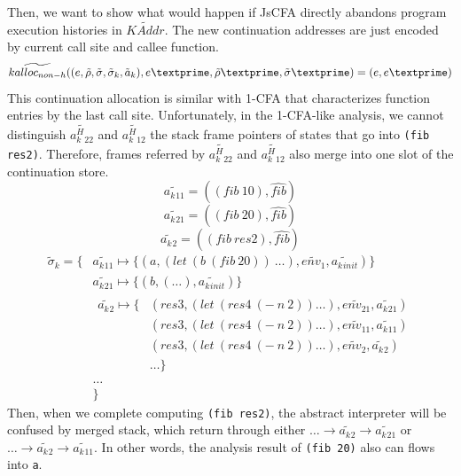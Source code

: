 \documentclass{article}
\begin{document}
Then, we want to show what would happen if JsCFA directly abandons program execution histories in $\widetilde{KAddr}$. The new continuation addresses are just encoded by current call site and callee function.
\[
\widetilde{kalloc_{non-h}} ((e, \tilde{\rho}, \tilde{\sigma}, \tilde{\sigma}_k, \tilde{a}_k), e\textprime, \tilde{\rho}\textprime, \tilde{\sigma}\textprime) =
(e, e\textprime)
\]
This continuation allocation is similar with 1-CFA that characterizes function entries by the last call site.
Unfortunately, in the 1-CFA-like analysis, we cannot distinguish $\widetilde{a^H_k{}_{22}}$ and $\widetilde{a^H_k{}_{12}}$ the stack frame pointers of states that go into \verb|(fib res2)|.
Therefore, frames referred by $\widetilde{a^H_k{}_{22}}$ and $\widetilde{a^H_k{}_{12}}$ also merge into one slot of the continuation store.
\[
\widetilde{a_k{}_{11}} = ((fib\ 10), \widehat{fib})
\]
\[
\widetilde{a_k{}_{21}} = ((fib\ 20), \widehat{fib})
\]
\[
\widetilde{a_k{}_{2}} = ((fib\ res2), \widehat{fib})
\]
\[
\begin{aligned}
\tilde{\sigma}_k = \{ {}& \widetilde{a_k{}_{11}} \mapsto \{(a, (let\ (b\ (fib\ 20))\ \dots), \widetilde{env_1}, \widetilde{a_k{}_{init}})\}  {} \\
                            & \widetilde{a_k{}_{21}} \mapsto \{(b, (\dots), \widetilde{a_k{}_{init}}) \} {}\\
                            &
                            \begin{aligned}
                              \widetilde{a_k{}_{2}} \mapsto
                              \{{}& (res3, (let\ (res4\ (-\ n\ 2)) \dots), \widetilde{env_{21}}, \widetilde{a_k{}_{21}}) {}\\
                              & (res3, (let\ (res4\ (-\ n\ 2)) \dots), \widetilde{env_{11}}, \widetilde{a_k{}_{11}}) {}\\
                              & (res3, (let\ (res4\ (-\ n\ 2)) \dots), \widetilde{env_2}, \widetilde{a_k{}_{2}}) {} \\
                              & \dots
                              \}
                            \end{aligned} {}\\
                            & \dots {}\\
                            & \}
\end{aligned}
\]
Then, when we complete computing \verb|(fib res2)|, the abstract interpreter will be confused by merged stack, which return through either $\dots \to \widetilde{a_k{}_{2}} \to \widetilde{a_k{}_{21}}$ or $\dots \to \widetilde{a_k{}_{2}} \to \widetilde{a_k{}_{11}}$.
In other words, the analysis result of \verb|(fib 20)| also can flows into \verb|a|.
\end{document}
